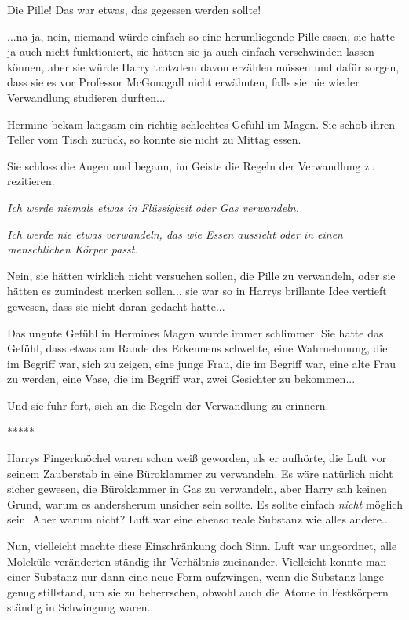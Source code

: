 Die Pille! Das war etwas, das gegessen werden sollte!

...na ja, nein, niemand würde einfach so eine herumliegende Pille essen, sie
hatte ja auch nicht funktioniert, sie hätten sie ja auch einfach verschwinden
lassen können, aber sie würde Harry trotzdem davon erzählen müssen und dafür
sorgen, dass sie es vor Professor McGonagall nicht erwähnten, falls sie nie
wieder Verwandlung studieren durften...

Hermine bekam langsam ein richtig schlechtes Gefühl im Magen. Sie schob ihren
Teller vom Tisch zurück, so konnte sie nicht zu Mittag essen.

Sie schloss die Augen und begann, im Geiste die Regeln der Verwandlung zu
rezitieren.

\emph{\glqq{}Ich werde niemals etwas in Flüssigkeit oder Gas verwandeln.\grqq{}}

\emph{\glqq{}Ich werde nie etwas verwandeln, das wie Essen aussieht oder in
einen menschlichen Körper passt.\grqq{}}

Nein, sie hätten wirklich nicht versuchen sollen, die Pille zu verwandeln, oder
sie hätten es zumindest merken sollen... sie war so in Harrys brillante Idee
vertieft gewesen, dass sie nicht daran gedacht hatte...

Das ungute Gefühl in Hermines Magen wurde immer schlimmer. Sie hatte das Gefühl,
dass etwas am Rande des Erkennens schwebte, eine Wahrnehmung, die im Begriff
war, sich zu zeigen, eine junge Frau, die im Begriff war, eine alte Frau zu
werden, eine Vase, die im Begriff war, zwei Gesichter zu bekommen...

Und sie fuhr fort, sich an die Regeln der Verwandlung zu erinnern.

\begin{center}*****\end{center}

Harrys Fingerknöchel waren schon weiß geworden, als er aufhörte, die Luft vor
seinem Zauberstab in eine Büroklammer zu verwandeln. Es wäre natürlich nicht
sicher gewesen, die Büroklammer in Gas zu verwandeln, aber Harry sah keinen
Grund, warum es andersherum unsicher sein sollte. Es sollte einfach \emph{nicht}
möglich sein. Aber warum nicht? Luft war eine ebenso reale Substanz wie alles
andere...

Nun, vielleicht machte diese Einschränkung doch Sinn. Luft war ungeordnet, alle
Moleküle veränderten ständig ihr Verhältnis zueinander. Vielleicht konnte man
einer Substanz nur dann eine neue Form aufzwingen, wenn die Substanz lange genug
stillstand, um sie zu beherrschen, obwohl auch die Atome in Festkörpern ständig
in Schwingung waren...

